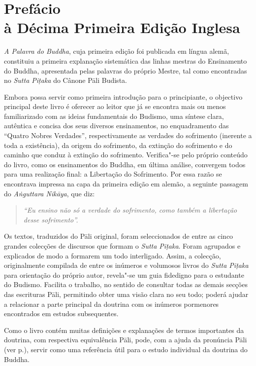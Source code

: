 \chapter[Prefácio à Décima Primeira Edição Inglesa]{Prefácio\\ à Décima Primeira Edição Inglesa}

\emph{A Palavra do Buddha}, cuja primeira edição foi publicada em língua alemã,
constituiu a primeira explanação sistemática das linhas mestras do Ensinamento
do Buddha, apresentada pelas palavras do próprio Mestre, tal como encontradas no
\emph{Sutta Piṭaka} do Cânone Pāli Budista.

Embora possa servir como primeira introdução para o principiante, o objectivo
principal deste livro é oferecer ao leitor que já se encontra mais ou menos
familiarizado com as ideias fundamentais do Budismo, uma síntese clara,
autêntica e concisa dos seus diversos ensinamentos, no enquadramento das
“Quatro Nobres Verdades”, respectivamente as verdades do sofrimento (inerente
a toda a existência), da origem do sofrimento, da extinção do sofrimento e do
caminho que conduz à extinção do sofrimento. Verifica"-se pelo próprio conteúdo
do livro, como os ensinamentos do Buddha, em última análise, convergem todos
para uma realização final: a Libertação do Sofrimento. Por essa razão se
encontrava impressa na capa da primeira edição em alemão, a seguinte passagem do
\emph{Aṅguttara Nikāya}, que diz:

\begin{verse}
  \emph{“Eu ensino não só a verdade do sofrimento, como também a libertação
    desse sofrimento”.}
\end{verse}

Os textos, traduzidos do Pāli original, foram seleccionados de entre as cinco
grandes colecções de discursos que formam o \emph{Sutta Piṭaka}. Foram agrupados
e explicados de modo a formarem um todo interligado. Assim, a colecção,
originalmente compilada de entre os inúmeros e volumosos livros do \emph{Sutta
  Piṭaka} para orientação do próprio autor, revela"-se um guia fidedigno para o
estudante do Budismo. Facilita o trabalho, no sentido de consultar todas as
demais secções das escrituras Pāli, permitindo obter uma visão clara no seu
todo; poderá ajudar a relacionar a parte principal da doutrina com os inúmeros
pormenores encontrados em estudos subsequentes.

Como o livro contém muitas definições e explanações de termos importantes da
doutrina, com respectiva equivalência Pāli, pode, com a ajuda da pronúncia Pāli
(ver p.\pageref{pron-pali}), servir como uma referência útil para o estudo individual
da doutrina do Buddha.


